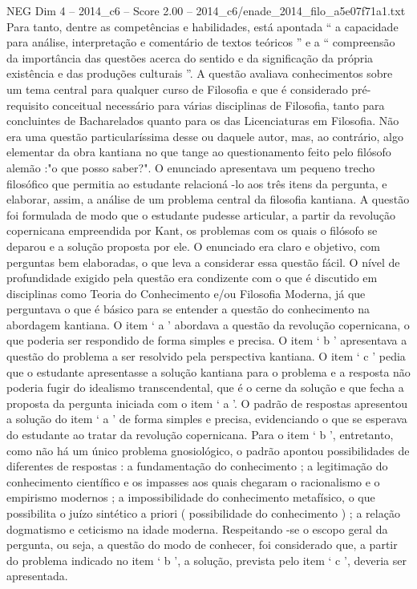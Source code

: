 \begin{textsample}{NEG Dim 4 – 2014\_c6 – Score 2.00 – 2014\_c6/enade\_2014\_filo\_a5e07f71a1.txt}
Para tanto, dentre as competências e habilidades, está apontada “ a capacidade para análise, interpretação e comentário de textos teóricos ” e a “ compreensão da importância das questões acerca do sentido e da significação da própria existência e das produções culturais ”.
A questão avaliava conhecimentos sobre um tema central para qualquer curso de Filosofia e que é considerado pré-requisito conceitual necessário para várias disciplinas de Filosofia, tanto para concluintes de Bacharelados quanto para os das Licenciaturas em Filosofia.
Não era uma questão particularíssima desse ou daquele autor, mas, ao contrário, algo elementar da obra kantiana no que tange ao questionamento feito pelo filósofo alemão :"o que posso saber?".
O enunciado apresentava um pequeno trecho filosófico que permitia ao estudante relacioná -lo aos três itens da pergunta, e elaborar, assim, a análise de um problema central da filosofia kantiana.
A questão foi formulada de modo que o estudante pudesse articular, a partir da revolução copernicana empreendida por Kant, os problemas com os quais o filósofo se deparou e a solução proposta por ele.
O enunciado era claro e objetivo, com perguntas bem elaboradas, o que leva a considerar essa questão fácil.
O nível de profundidade exigido pela questão era condizente com o que é discutido em disciplinas como Teoria do Conhecimento e/ou Filosofia Moderna, já que perguntava o que é básico para se entender a questão do conhecimento na abordagem kantiana.
O item ‘ a ’ abordava a questão da revolução copernicana, o que poderia ser respondido de forma simples e precisa.
O item ‘ b ’ apresentava a questão do problema a ser resolvido pela perspectiva kantiana.
O item ‘ c ’ pedia que o estudante apresentasse a solução kantiana para o problema e a resposta não poderia fugir do idealismo transcendental, que é o cerne da solução e que fecha a proposta da pergunta iniciada com o item ‘ a ’.
O padrão de respostas apresentou a solução do item ‘ a ’ de forma simples e precisa, evidenciando o que se esperava do estudante ao tratar da revolução copernicana.
Para o item ‘ b ’, entretanto, como não há um único problema gnosiológico, o padrão apontou possibilidades de diferentes de respostas : a fundamentação do conhecimento ; a legitimação do conhecimento científico e os impasses aos quais chegaram o racionalismo e o empirismo modernos ; a impossibilidade do conhecimento metafísico, o que possibilita o juízo sintético a priori ( possibilidade do conhecimento ) ; a relação dogmatismo e ceticismo na idade moderna.
Respeitando -se o escopo geral da pergunta, ou seja, a questão do modo de conhecer, foi considerado que, a partir do problema indicado no item ‘ b ’, a solução, prevista pelo item ‘ c ’, deveria ser apresentada.

\end{textsample}
